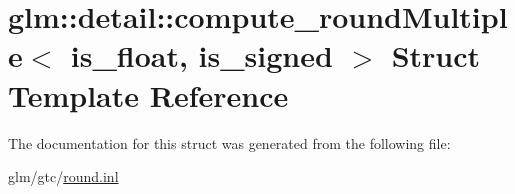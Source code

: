 \hypertarget{structglm_1_1detail_1_1compute__roundMultiple}{\section{glm\-:\-:detail\-:\-:compute\-\_\-round\-Multiple$<$ is\-\_\-float, is\-\_\-signed $>$ Struct Template Reference}
\label{structglm_1_1detail_1_1compute__roundMultiple}
}


The documentation for this struct was generated from the following file\-:\begin{DoxyCompactItemize}
\item 
glm/gtc/\hyperlink{round_8inl}{round.\-inl}\end{DoxyCompactItemize}
